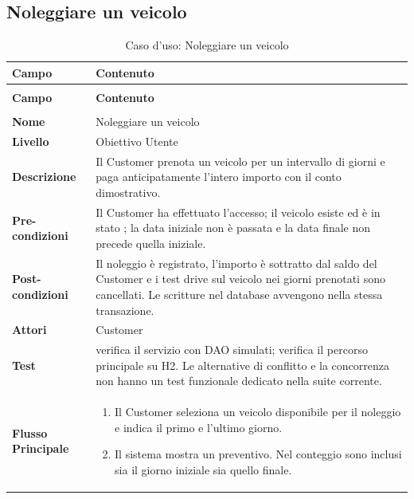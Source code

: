 \subsection{Noleggiare un veicolo}\label{sec:uc-noleggio}
\begin{xltabular}{\textwidth}{| >{\bfseries}p{.22\textwidth} | >{\raggedright\arraybackslash}X |}
\caption{Caso d'uso: Noleggiare un veicolo}\label{tab:uc-noleggio}\\
\hline
{} Campo & \textbf{Contenuto}\\\hline
\endfirsthead
{}\\
\hline
{} Campo & \textbf{Contenuto}\\\hline
\endhead
\hline
{}\\
\endfoot
\endlastfoot
Nome & Noleggiare un veicolo\\\hline
Livello & Obiettivo Utente\\\hline
Descrizione & Il Customer prenota un veicolo per un intervallo di giorni e paga anticipatamente l'intero importo con il conto dimostrativo.\\\hline
Pre-condizioni & Il Customer ha effettuato l'accesso; il veicolo esiste ed è in stato ; la data iniziale non è passata e la data finale non precede quella iniziale.\\\hline
Post-condizioni & Il noleggio è registrato, l'importo è sottratto dal saldo del Customer e i test drive sul veicolo nei giorni prenotati sono cancellati. Le scritture nel database avvengono nella stessa transazione.\\\hline
Attori & Customer\\\hline
Test &  verifica il servizio con DAO simulati;  verifica il percorso principale su H2. Le alternative di conflitto e la concorrenza non hanno un test funzionale dedicato nella suite corrente.\\\hline
Flusso Principale &
\begin{enumerate}[label=\arabic*.,start=1,leftmargin=*,nosep]
  \item Il Customer seleziona un veicolo disponibile per il noleggio e indica il primo e l'ultimo giorno.
  \item Il sistema mostra un preventivo. Nel conteggio sono inclusi sia il giorno iniziale sia quello finale.

\end{enumerate}
\end{xltabular}
